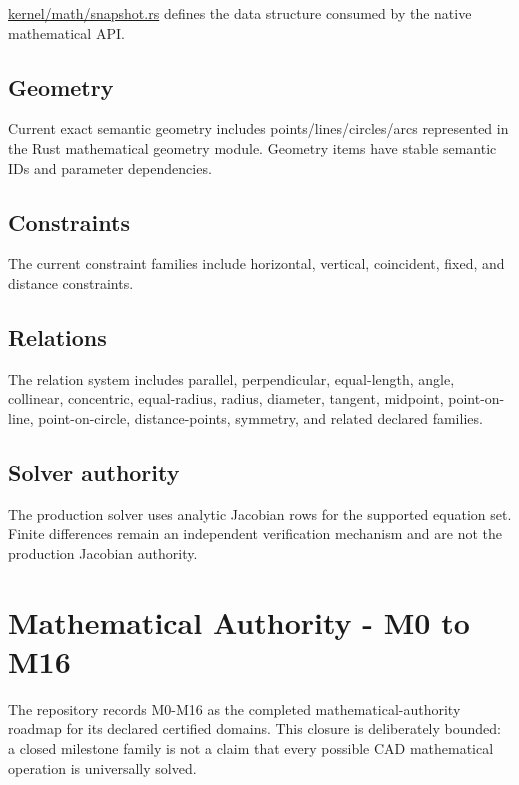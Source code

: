 \documentclass[11pt,a4paper]{report}
\newcommand{\pathref}[1]{\url{#1}}
\begin{document}
\pathref{kernel/math/snapshot.rs} defines the data structure consumed by the native mathematical API.

\section{Geometry}
Current exact semantic geometry includes points/lines/circles/arcs represented in the Rust mathematical geometry module. Geometry items have stable semantic IDs and parameter dependencies.

\section{Constraints}
The current constraint families include horizontal, vertical, coincident, fixed, and distance constraints.

\section{Relations}
The relation system includes parallel, perpendicular, equal-length, angle, collinear, concentric, equal-radius, radius, diameter, tangent, midpoint, point-on-line, point-on-circle, distance-points, symmetry, and related declared families.

\section{Solver authority}
The production solver uses analytic Jacobian rows for the supported equation set. Finite differences remain an independent verification mechanism and are not the production Jacobian authority.

\chapter{Mathematical Authority - M0 to M16}

The repository records M0-M16 as the completed mathematical-authority roadmap for its declared certified domains. This closure is deliberately bounded: a closed milestone family is not a claim that every possible CAD mathematical operation is universally solved.
\end{document}
